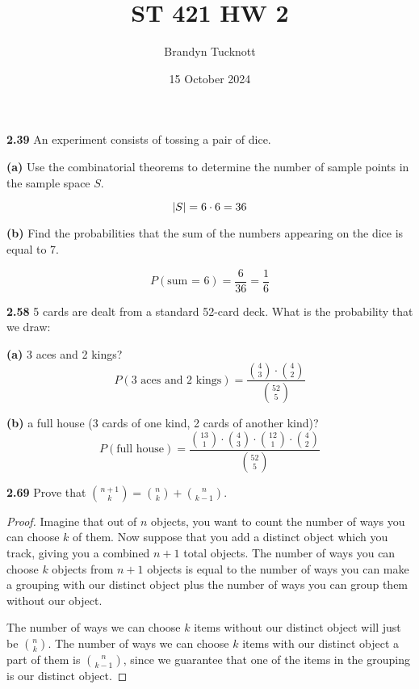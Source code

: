 \documentclass{exam}
\title{ST 421 HW 2}
\author{Brandyn Tucknott}
\date{15 October 2024}
\begin{document}
\maketitle

\begin{questions}
    \textbf{2.39 } An experiment consists of tossing a pair of dice.

\newline
\newline

\textbf{(a) }
Use the combinatorial theorems to determine the number of sample points in the sample space $S$.

\sol
$$\left| S \right| = 6 \cdot 6 = 36$$

\newline

\textbf{(b) }
Find the probabilities that the sum of the numbers appearing on the dice is equal to 7.

\sol
$$P(\text{sum = 6}) = \frac{6}{36} = \frac{1}{6}$$


\newpage
\textbf{2.58 }
5 cards are dealt from a standard 52-card deck. What is the probability that we draw:

\textbf{(a) } 3 aces and 2 kings?
\sol
$$P(\text{3 aces and 2 kings}) = \frac{\binom{4}{3} \cdot \binom{4}{2}}{\binom{52}{5}}$$


\textbf{(b) } a full house (3 cards of one kind, 2 cards of another kind)?
\sol
$$P(\text{full house}) = \frac{\binom{13}{1} \cdot \binom{4}{3} \cdot \binom{12}{1} \cdot \binom{4}{2}}{\binom{52}{5}}$$





\newpage
\textbf{2.69 }
Prove that $\binom{n + 1}{k} = \binom{n}{k} + \binom{n}{k - 1}$.

\begin{proof}

Imagine that out of $n$ objects, you want to count the number of ways you can choose $k$ of them. Now suppose that you add a distinct object which you track, giving you a combined $n + 1$ total objects. The number of ways you can choose $k$ objects from $n + 1$ objects is equal to the number of ways you can make a grouping with our distinct object plus the number of ways you can group them without our object.

The number of ways we can choose $k$ items without our distinct object will just be $\binom{n}{k}$. The number of ways we can choose $k$ items with our distinct object a part of them is $\binom{n}{k - 1}$, since we guarantee that one of the items in the grouping is our distinct object.


\end{proof}
\end{questions}
\end{document}
